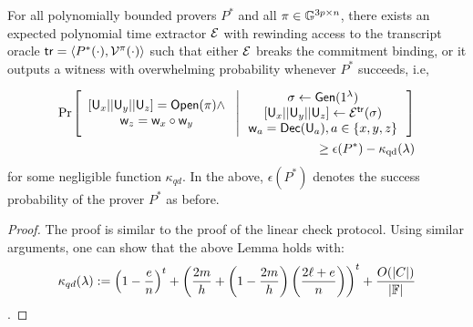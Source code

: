

\begin{lemma}[Soundness]\label{lem:quadcheck_sound}
For all polynomially bounded provers $P^\ast$ and all $\pi\in \mathbb{G}^{3p\times n}$,
there exists an expected polynomial time extractor $\mathcal{E}$ with rewinding access
to the transcript oracle $\mathsf{tr}=\langle P^\ast(\cdot),\mathcal{V}^{\pi}(\cdot)\rangle$
such that either $\mathcal{E}$ breaks the commitment binding, or it outputs a witness
with overwhelming probability whenever $P^\ast$ succeeds, i.e,

{\footnotesize
\begin{align*}
\condprob{
\begin{array}{c}
{[}\ewit_x||\ewit_y||\ewit_z{]}=\open(\pi)\wedge \\
\wit_z=\wit_x\circ\wit_y
\end{array}
}{
\begin{array}{c}
\sigma %
\leftarrow \gen(\secparam) \\
{[}\ewit_x||\ewit_y||\ewit_z{]}%
\leftarrow \extr^{\mathsf{tr}}(\sigma) \\ 
\wit_a=\dec(\ewit_a), a\in \{x,y,z\}
\end{array}
}\\
\geq \epsilon(P^\ast) - \kappa_{\rm qd}(\secpar)
\end{align*}
}
for some negligible function $\kappa_{qd}$. In the above, $\epsilon(P^\ast)$
denotes the success probability of the prover $P^\ast$ as before.
\end{lemma}
\begin{proof}
The proof is similar to the proof of the linear check protocol. Using similar
arguments, one can show that the above Lemma holds with:
$$
\kappa_{qd}(\lambda) := \left(1-\frac{e}{n}\right)^t +
\left(\frac{2m}{h}+\left(1-\frac{2m}{h}\right)\left(\frac{2\ell+e}{n}\right)\right)^t
+ \frac{O(|C|)}{|\mathbb{F}|}
$$.
\end{proof}


